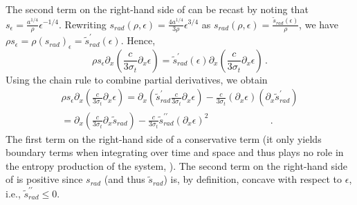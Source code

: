 \documentclass[times,doublespace]{fldauth}%
\begin{document}
The second term on the right-hand side of  can be recast by noting that $s_\epsilon = 
\frac{a^{1/4}}{\rho} \epsilon^{-1/4}$. Rewriting $s_{rad}(\rho, \epsilon) = \frac{4a^{1/4}}{3\rho} \epsilon^{3/4}$ 
as  $s_{rad}(\rho, \epsilon) = \frac{\tilde{s}_{rad}(\epsilon)}{\rho}$, we have
$ \rho s_\epsilon = \rho (s_{rad})_\epsilon = \tilde{s}^\prime_{rad}(\epsilon)$. Hence, 
\begin{equation}
\rho s_\epsilon \partial_x \left( \frac{c}{3 \sigma_t} \partial_x \epsilon \right) 
=
 \tilde{s}^\prime_{rad}(\epsilon) \partial_x \left( \frac{c}{3 \sigma_t} \partial_x \epsilon \right)  \,.
\end{equation}
%
Using the chain rule to combine partial derivatives, we obtain
%
\begin{multline} \label{eq:final_form_second_term}
\rho s_\epsilon \partial_x \left( \frac{c}{3 \sigma_t} \partial_x \epsilon \right) 
=
 \partial_x \left(  \tilde{s}^\prime_{rad}  \frac{c}{3 \sigma_t} \partial_x \epsilon \right) 
-
\frac{c}{3 \sigma_t} \left(  \partial_x \epsilon \right)  \left( \partial_x \tilde{s}^\prime_{rad}  \right) \\
=
 \partial_x \left(   \frac{c}{3 \sigma_t} \partial_x \tilde{s}_{rad}  \right) 
-
\frac{c}{3 \sigma_t} \tilde{s}^{\prime\prime}_{rad}  \left(  \partial_x \epsilon \right)^2   \qquad  \qquad  \qquad \  \,.
\end{multline}
%
The first term on the right-hand side of  a conservative term (it only yields boundary 
terms when integrating over time and space and thus plays no role in the entropy production of the system, 
\cite{Leveque}). The second term on the right-hand side of  is positive 
since $s_{rad}$ (and thus $\tilde{s}_{rad}$) is, by definition, concave with respect to $\epsilon$, i.e., $\tilde{s}^{\prime\prime}_{rad} \leq 0$.
\end{document}
